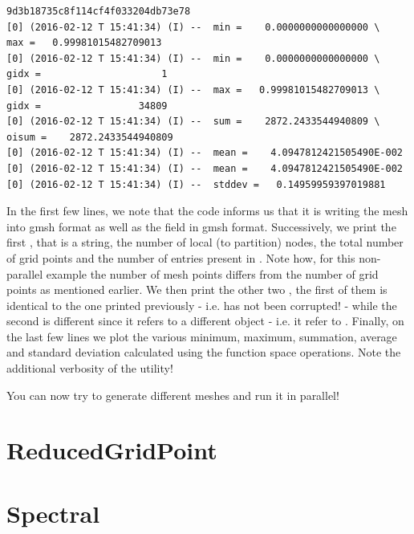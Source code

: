 \begin{lstlisting}[style=BashStyle]
9d3b18735c8f114cf4f033204db73e78                                                                                                                                                                                                                                                                                                                                                                                                                                                                                                                                                                                                                                                                                                                                                                                                                                                                                                                                                                                                                                
[0] (2016-02-12 T 15:41:34) (I) --  min =    0.0000000000000000 \      
max =   0.99981015482709013
[0] (2016-02-12 T 15:41:34) (I) --  min =    0.0000000000000000 \ 
gidx =                     1
[0] (2016-02-12 T 15:41:34) (I) --  max =   0.99981015482709013 \
gidx =                 34809
[0] (2016-02-12 T 15:41:34) (I) --  sum =    2872.2433544940809 \      
oisum =    2872.2433544940809
[0] (2016-02-12 T 15:41:34) (I) --  mean =    4.0947812421505490E-002
[0] (2016-02-12 T 15:41:34) (I) --  mean =    4.0947812421505490E-002
[0] (2016-02-12 T 15:41:34) (I) --  stddev =   0.14959959397019881

\end{lstlisting}
%
In the first few lines, we note that the code informs us that it is 
writing the mesh into gmsh format as well as the field in gmsh format.
Successively, we print the first , that is a string, 
the number of local (to partition) nodes, the total number of grid 
points and the number of entries present in \inltf{globalField}. 
Note how, for this non-parallel example the number of mesh points 
differs from the number of grid points as mentioned earlier. We 
then print the other two \inltf{checksum}, the first of them is 
identical to the one printed previously - i.e.  
has not been corrupted! - while the second is different since it 
refers to a different object - i.e. it refer to .
Finally, on the last few lines we plot the various minimum, maximum, 
summation, average and standard deviation calculated using the 
function space operations.
Note the additional verbosity of the \inltf{atlas\_log} \Atlas utility!

You can now try to generate different meshes and run it in parallel!


\section{ReducedGridPoint}
\section{Spectral}

